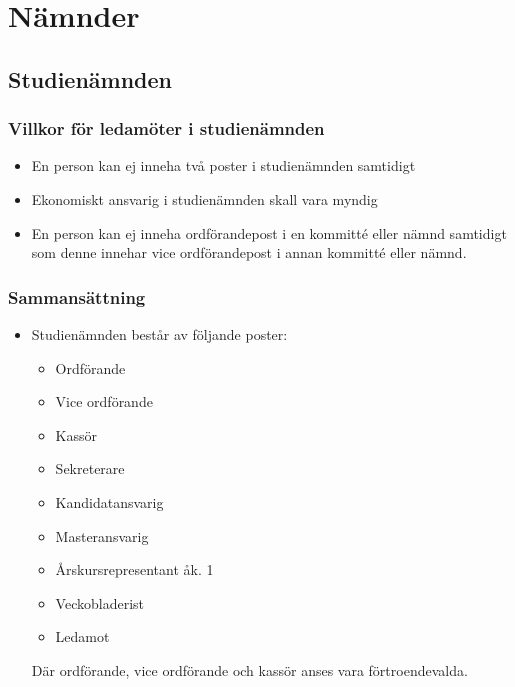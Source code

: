 \documentclass[11pt,a4paper]{article}
\begin{document}
\newpage

\section{Nämnder}

\subsection{Studienämnden}

\subsubsection{Villkor för ledamöter i studienämnden}
\begin{itemize}
\item En person kan ej inneha två poster i studienämnden samtidigt
\item Ekonomiskt ansvarig i studienämnden skall vara myndig
\item En person kan ej inneha ordförandepost i en kommitté eller nämnd samtidigt som denne innehar vice ordförandepost i annan kommitté eller nämnd.
\end{itemize}

\subsubsection{Sammansättning}

\begin{itemize}

  \item Studienämnden består av följande poster:
    \begin{itemize}

      \item Ordförande
      \item Vice ordförande
      \item Kassör
      \item Sekreterare
      \item Kandidatansvarig
      \item Masteransvarig
      \item Årskursrepresentant åk. 1
      \item Veckobladerist
      \item Ledamot

    \end{itemize}
Där ordförande, vice ordförande och kassör anses vara förtroendevalda.

\end{itemize}
\end{document}
